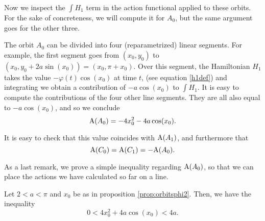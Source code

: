 Now we inspect the $\int H_1$ term in the action functional applied to these orbits. For the sake of concreteness, we will compute it for $A_0$, but the same argument goes for the other three.

The orbit $A_0$ can be divided into four (reparametrized) linear segments. For example, the first segment goes from $(x_0, y_0)$ to $(x_0, y_0 + 2a \sin(x_0)) = (x_0, \pi + x_0)$. Over this segment, the Hamiltonian $H_1$ takes the value $- \varphi(t) \cos(x_0)$ at time $t$, (see equation \eqref{h1def}) and integrating we obtain a contribution of $- a \cos(x_0)$ to $\int H_1$. It is easy to compute the contributions of the four other line segments. They are all also equal to $- a \cos(x_0)$, and so we conclude
\begin{equation}
\AA(A_0) = - 4 x_0^2 - 4 a \cos(x_0).
\end{equation}

It is easy to check that this value coincides with $\AA(A_1)$, and furthermore that
\begin{equation}
\AA(C_0) = \AA(C_1) = - \AA(A_0).
\end{equation}

As a last remark, we prove a simple inequality regarding $\AA(A_0)$, so that we can place the actions we have calculated so far on a line.

\begin{prop}\label{prop:ineq4beta}
Let $2 < a < \pi$ and $x_0$ be as in proposition \ref{prop:orbitsphi2}. Then, we have the inequality
\begin{equation}
0 < 4 x_0^2 + 4 a \cos(x_0) < 4a.
\end{equation}
\end{prop}

